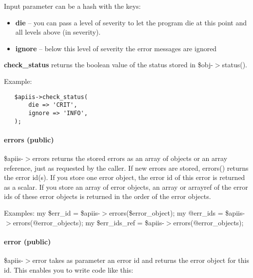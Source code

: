 Input parameter can be a hash with the keys:

\begin{itemize}

\item \textbf{die} -- you can pass a level of severity to let the program die
        at this point and all levels above (in severity).
\item \textbf{ignore} -- below this level of severity the error messages are ignored\end{itemize}


\textbf{check\_status} returns the boolean value of the status stored in
\$obj-$>$status().



Example:

\begin{verbatim}
   $apiis->check_status(
       die => 'CRIT',
       ignore => 'INFO',
   );
\end{verbatim}
\paragraph*{errors (public)\label{Apiis::Init_--_Basic_initialisation_object_for_the_complete_APIIS_structure_errors_public_}}


\$apiis-$>$errors returns the stored errors as an array of objects or an array
reference, just as requested by the caller.
If new errors are stored, errors() returns the error id(s). If you store
one error object, the error id of this error is returned as a scalar. If
you store an array of error objects, an array or arrayref of the error ids
of these error objects is returned in the order of the error objects.



Examples:
   my \$err\_id      = \$apiis-$>$errors(\$error\_object);
   my @err\_ids     = \$apiis-$>$errors(@error\_objects);
   my \$err\_ids\_ref = \$apiis-$>$errors(@error\_objects);

\paragraph*{error (public)\label{Apiis::Init_--_Basic_initialisation_object_for_the_complete_APIIS_structure_error_public_}}


\$apiis-$>$error takes as parameter an error id and returns the error object
for this id. This enables you to write code like this:


